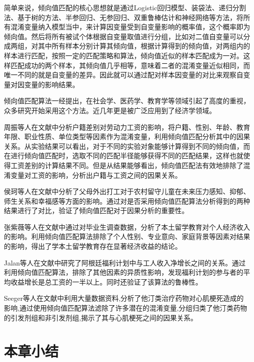 简单来说，倾向值匹配的核心思想就是通过Logistic回归模型、装袋法、递归分割法、基于树的方法、半参回归、无参回归、双重鲁棒估计和神经网络等方法，将所有混淆变量纳入模型当中，来计算因变量受到自变量影响的概率值，这个概率即为倾向值。然后将所有被试个体根据自变量取值进行分组，比如对二值自变量可以分成两组，对其中所有样本分别计算其倾向值，根据计算得到的倾向值，对两组内的样本进行匹配，按照一定的匹配策略和算法，倾向值近似的样本匹配成为一对。这样匹配成功的两个样本，其倾向值几乎相等，意味着二者的混淆变量近似相同，而唯一不同的就是自变量的差异。因此就可以通过配对样本因变量的对比来观察自变量对因变量的影响结果\cite{胡安宁2012倾向值匹配与因果推论}。

倾向值匹配算法一经提出，在社会学、医药学、教育学等领域引起了高度的重视，众多研究开始采用这个方法。近几年更是被广泛应用到了经济学领域。

周振等人在文献\cite{周振2014户籍歧视与城乡劳动力工资差异}中分析户籍差别对劳动力工资的影响，将户籍、性别、年龄、教育年限、职业性质、单位类型等因素作为混淆变量，利用倾向值匹配分析其中的因果关系。从实验结果可以看出，对于不同的实验对象能够计算得到不同的倾向值，而在进行倾向值匹配时，选取不同的匹配半径能够获得不同的匹配结果，这样也就使得工资差别的计算结果不同。但是从结果能够看出，倾向值匹配法有效地排除了混淆变量对工资的影响，分析出户籍与工资之间的因果关系。

侯珂等人在文献\cite{侯珂2014留守对农村儿童青少年社会适应的影响}中分析了父母外出打工对于农村留守儿童在未来压力感知、抑郁、师生关系和幸福感等方面的影响。通过对是否采用倾向值匹配算法分析得到的两种结果进行了对比，验证了倾向值匹配对于因果分析的重要性。

张紫薇等人在文献\cite{张紫薇2016大学本土留学教育个人收益的计量分析}中通过对毕业生调查数据，分析了本土留学教育对个人经济收入的影响。利用倾向值匹配算法排除了个人性别、专业意向、家庭背景等因素对结果的影响，得出了学本土留学教育存在显著经济收益的结论。

Jalan等人在文献\cite{jalan2003estimating}中研究了阿根廷福利计划中与工人收入净增长之间的关系。通过利用倾向值匹配算法，排除了其他因素的异质性影响，发现福利计划的参与者的平均收益增长是总工资的一半以上。同时还验证了该算法的鲁棒性。

Seeger等人在文献\cite{seeger2005application}中利用大量数据资料,分析了他汀类治疗药物对心肌梗死造成的影响,通过使用倾向值匹配算法滤除了许多潜在的混淆变量,分组归类了他汀类药物的引发剂组和非引发剂组,揭示了其与心肌梗死之间的因果关系。

\section{本章小结}

